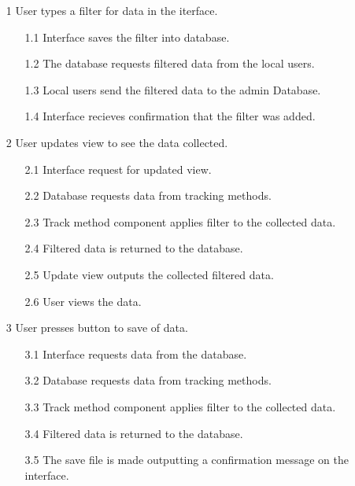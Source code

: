 \begin{flushleft}
\newpage
\begin{enumerate}
   \item[1] User types a filter for data in the iterface. 
   \begin{itemize}
     \item[1.1] Interface saves the filter into database.
     \item[1.2] The database requests filtered data from the local users.
     \item[1.3] Local users send the filtered data to the admin Database.
     \item[1.4] Interface recieves confirmation that the filter was added.
   \end{itemize}
   \item[2] User updates view to see the data collected.
   \begin{itemize}
     \item[2.1] Interface request for updated view.
     \item[2.2] Database requests data from tracking methods.
     \item[2.3] Track method component applies filter to the collected data.
     \item[2.4] Filtered data is returned to the database.
     \item[2.5] Update view outputs the collected filtered data.
     \item[2.6] User views the data.
   \end{itemize}
   \item[3] User presses button to save of data.
   \begin{itemize}
     \item[3.1] Interface requests data from the database. 
     \item[3.2] Database requests data from tracking methods.
     \item[3.3] Track method component applies filter to the collected data.
     \item[3.4] Filtered data is returned to the database.
     \item[3.5] The save file is made outputting a confirmation message on the interface.
   \end{itemize}
\end{enumerate}
\end{flushleft}
